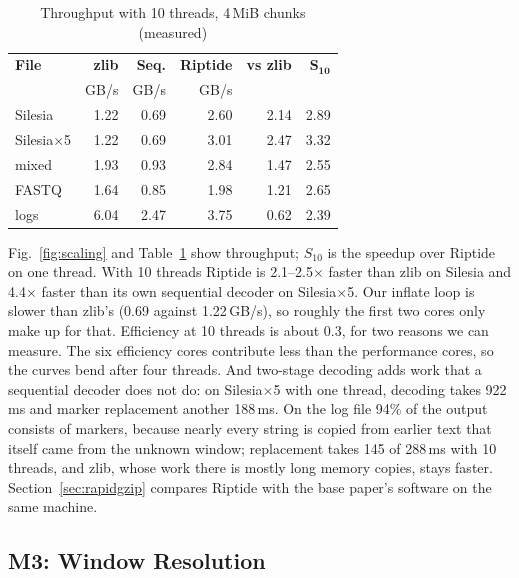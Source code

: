\documentclass[conference]{IEEEtran}
\begin{document}
\begin{table}[t]
\caption{Throughput with 10 threads, 4\,MiB chunks (measured)}
\label{tab:scaling}
\centering
\footnotesize
\setlength{\tabcolsep}{3pt}
\begin{tabular}{@{}lrrrrr@{}}
\toprule
\textbf{File} & \textbf{zlib} & \textbf{Seq.} & \textbf{Riptide} & \textbf{vs zlib} & $\boldsymbol{S_{10}}$ \\
 & GB/s & GB/s & GB/s & & \\
\midrule
Silesia & 1.22 & 0.69 & 2.60 & 2.14 & 2.89 \\
Silesia$\times$5 & 1.22 & 0.69 & 3.01 & 2.47 & 3.32 \\
mixed & 1.93 & 0.93 & 2.84 & 1.47 & 2.55 \\
FASTQ & 1.64 & 0.85 & 1.98 & 1.21 & 2.65 \\
logs & 6.04 & 2.47 & 3.75 & 0.62 & 2.39 \\
\bottomrule
\end{tabular}
\end{table}

Fig.~\ref{fig:scaling} and Table~\ref{tab:scaling} show throughput; $S_{10}$ is the
speedup over Riptide on one thread. With 10 threads Riptide is 2.1--2.5$\times$
faster than zlib on Silesia and 4.4$\times$ faster than its own sequential decoder
on Silesia$\times$5. Our inflate loop is slower than zlib's (0.69 against
1.22\,GB/s), so roughly the first two cores only make up for that. Efficiency at
10 threads is about 0.3, for two reasons we can measure. The six efficiency cores
contribute less than the performance cores, so the curves bend after four threads.
And two-stage decoding adds work that a sequential decoder does not do: on
Silesia$\times$5 with one thread, decoding takes 922\,ms and marker replacement
another 188\,ms. On the log file 94\% of the output consists of markers, because
nearly every string is copied from earlier text that itself came from the unknown
window; replacement takes 145 of 288\,ms with 10 threads, and zlib, whose work there
is mostly long memory copies, stays faster. Section~\ref{sec:rapidgzip} compares
Riptide with the base paper's software on the same machine.

\subsection{M3: Window Resolution}
\end{document}
